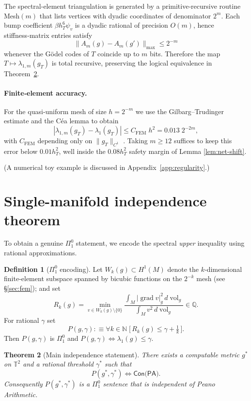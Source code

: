 \documentclass[11pt]{article}
\newtheorem{theorem}{Theorem}[section]
\theoremstyle{definition}\newtheorem{definition}[theorem]{Definition}
\theoremstyle{remark}\newtheorem{remark}[theorem]{Remark}
\DeclareMathOperator{\grad}{grad}
\DeclareMathOperator{\vol}{vol}
\newcommand{\Wk}{W_k(g)}                      %
\begin{document}
The spectral-element triangulation is generated by a
primitive‑recursive routine \textsf{Mesh}$(m)$ that lists vertices with
dyadic coordinates of denominator $2^{m}$.  Each bump coefficient
$\beta h_T^{6}\psi_v$ is a dyadic rational of precision
$O(m)$, hence stiffness‑matrix entries satisfy
\[
   \|A_m(g)-A_m(g')\|_{\max}\le 2^{-m}
\]
whenever the Gödel codes of $T$ coincide up to $m$ bits.
Therefore the map $T\mapsto\lambda_{1,m}(g_T)$ is total recursive,
preserving the logical equivalence in Theorem~\ref{thm:gap}.

\paragraph{Finite‑element accuracy.}
For the quasi‑uniform mesh of size $h=2^{-m}$ we use the
Gilbarg–Trudinger estimate and the Céa lemma to obtain
\[
   |\lambda_{1,m}(g_T)-\lambda_{1}(g_T)|
   \le C_{\mathrm{FEM}}\;h^{2}
   = 0.013\;2^{-2m},
\]
with $C_{\mathrm{FEM}}$ depending only on
$\|g_T\|_{C^{1}}$ \cite[Thm.\,10.2.13]{BrennerScott2008}.  Taking
$m\ge12$ suffices to keep this error below $0.01h_T^{2}$, well inside
the $0.08h_T^{2}$ safety margin of Lemma \ref{lem:net-shift}.

(A numerical toy example is discussed in
Appendix~\ref{app:regularity}.)

\section{Single-manifold independence theorem}\label{sec:gap}

To obtain a genuine $\Pi^0_1$ statement, we encode the spectral \emph{upper} inequality using rational approximations.

\begin{definition}[$\Pi^0_1$ encoding]\label{def:P}
Let $\Wk\subset H^{1}(M)$ denote the $k$‑dimensional finite‑element
subspace spanned by bicubic functions on the $2^{-k}$ mesh (see
§\ref{sec:fem}); and set
\[
R_k(g)=\min_{v\in \Wk\setminus\{0\}}
       \frac{\int_M |\grad v|_{g}^{2}\,d\vol_g}
            {\int_M v^{2}\,d\vol_g}\in\mathbb Q.
\]
For rational $\gamma$ set
\[
P(g,\gamma):\equiv
\forall k\in\mathbb N\;\bigl[\,R_k(g)\le\gamma+\tfrac1k\,\bigr].
\]
Then $P(g,\gamma)$ is $\Pi^{0}_{1}$ and
$P(g,\gamma)\iff \lambda_{1}(g)\le\gamma$.
\end{definition}

\begin{theorem}[Main independence statement]\label{thm:gap}
There exists a computable metric $g^\ast$ on $\mathbb T^{2}$ and a
rational threshold $\gamma^\ast$ such that
\[
P(g^\ast,\gamma^\ast) \Longleftrightarrow \textsf{Con(PA)}.
\]
Consequently $P(g^\ast,\gamma^\ast)$ is a $\Pi^0_1$ sentence that is
independent of Peano Arithmetic.
\end{theorem}
\end{document}
